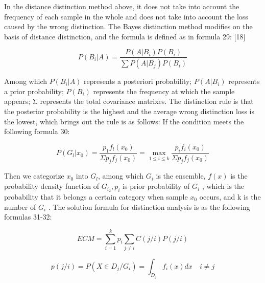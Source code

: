 In the distance distinction method above, it does not take into account the frequency of each sample in the whole and does not take into account the loss caused by the wrong distinction. The Bayes distinction method modifies on the basis of distance distinction, and the formula is defined as in formula 29: [18]

\begin{equation}
P \left( B _ { i } | A \right) = \frac { P ( A | B _ { i } ) P \left( B _ { i } \right) } { \sum P ( A | B _ { j } ) P \left( B _ { i } \right) }
\end{equation}

Among which $P \left( B _ { i } | A \right)$ represents a posteriori probability; $P ( A | B _ { i } )$ represents a prior probability; $P \left( B _ { i } \right)$ represents the frequency at which the sample appears; Σ represents the total covariance matrixes. The distinction rule is that the posterior probability is the highest and the average wrong distinction loss is the lowest, which brings out the rule is as follows: If the condition meets the following formula 30:

\begin{equation}
P \left( G _ { l } | x _ { 0 } \right) = \frac { p _ { 1 } f _ { l } \left( x _ { 0 } \right) } { \Sigma p _ { j } f _ { j } \left( x _ { 0 } \right) }=\max _ {  1 \leq i \leq k  } \frac { p _ { i } f _ { i } \left( x _ { 0 } \right) } { \Sigma p _ { j } f _ { j } \left( x _ { 0 } \right) }
\end{equation}

Then we categorize $x _ { 0 }$ into $G _ { l }$, among which $G _ { i }$ is the ensemble, $f ( x )$ is the probability density function of $G _ { i _ { 2 } }, p _ { i }$ is prior probability of $G _ { i }$ , which is the probability that it belongs a certain category when sample  $x _ { 0 }$ occurs, and k is the number of $G _ { i }$ . The solution formula for distinction analysis is as the following formulas 31-32:

\begin{equation}
E C M = \sum _ { i = 1 } ^ { k } p _ { i } \sum _ { j \neq i } C ( j / i ) P ( j / i )
\end{equation}

\begin{equation}
p ( j / i ) = P \left( X \in D _ { j } / G _ { i } \right) = \int _ { D _ { j } } f _ { i } ( x ) d x \quad i \neq j
\end{equation}



